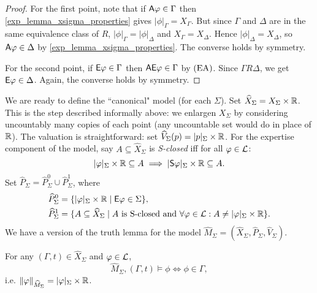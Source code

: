 \begin{proof}
    For the first point, note that if $\mathsf{A}\varphi \in \Gamma$ then
    \cref{exp_lemma_xsigma_properties} gives $|\phi|_\Gamma = X_\Gamma$. But since
    $\Gamma$ and $\Delta$ are in the same equivalence class of $R$,
    $|\phi|_\Gamma = |\phi|_\Delta$ and $X_\Gamma = X_\Delta$.  Hence
    $|\phi|_\Delta = X_\Delta$, so $\mathsf{A}\varphi \in \Delta$ by
    \cref{exp_lemma_xsigma_properties}. The converse holds by symmetry.

    For the second point, if $\mathsf{E}\varphi \in \Gamma$ then $\mathsf{A}\mathsf{E}\varphi \in \Gamma$ by
    $(\text{EA})$. Since $\Gamma R \Delta$, we get $\mathsf{E}\varphi \in \Delta$. Again, the
    converse holds by symmetry.
\end{proof}

We are ready to define the ``canonical" model (for each $\Sigma$). Set
$\widehat{X}_\Sigma = X_\Sigma \times \mathbb{R}$. This is the step described
informally above: we enlargen $X_\Sigma$ by considering uncountably many copies
of each point (any uncountable set would do in place of $\mathbb{R}$). The valuation is
straightforward: set $\widehat{V}_\Sigma(p) = |p|_\Sigma \times \mathbb{R}$. For the
expertise component of the model, say $A \subseteq \widehat{X}_\Sigma$ is
\emph{S-closed} iff for all $\varphi \in \mathcal{L}$:
\[
    |\varphi|_\Sigma \times \mathbb{R} \subseteq A
    \implies |\mathsf{S}\varphi|_\Sigma \times \mathbb{R} \subseteq A.
\]
Set $\widehat{P}_\Sigma = \widehat{P}_\Sigma^0 \cup \widehat{P}_\Sigma^1$,
where
\[
\begin{aligned}
 \widehat{P}_\Sigma^0 &= \{|\varphi|_\Sigma \times \mathbb{R} \mid \mathsf{E}\varphi \in \Sigma\}, \\
 \widehat{P}_\Sigma^1 &= \{
     A \subseteq \widehat{X}_\Sigma
     \mid
     A \text{ is S-closed and }
     \forall \varphi \in \mathcal{L}: A \ne |\varphi|_\Sigma \times \mathbb{R}
 \}.
\end{aligned}
\]
We have a version of the truth lemma for the model $\widehat{M}_\Sigma =
(\widehat{X}_\Sigma, \widehat{P}_\Sigma, \widehat{V}_\Sigma)$.

\begin{lemma}
\label{exp_lemma_truth_lemma}
    For any $(\Gamma, t) \in \widehat{X}_\Sigma$ and $\varphi \in \mathcal{L}$,
    \[
        \widehat{M}_\Sigma, (\Gamma, t) \models \phi
        \iff
        \phi \in \Gamma,
    \]
    i.e. $\|\varphi\|_{\widehat{M}_\Sigma} = |\varphi|_\Sigma \times \mathbb{R}$.
\end{lemma}

